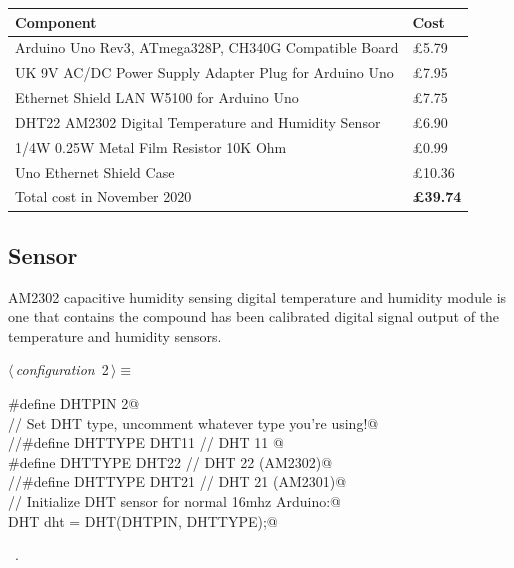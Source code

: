 \documentclass[a4paper, 12pt]{article}
\begin{document}
\begin{tabular}{ll}
  \textbf{Component} & \textbf{Cost} \\ 
  \hline
  Arduino Uno Rev3, ATmega328P, CH340G Compatible Board & \pounds 5.79 \\
  UK 9V AC/DC Power Supply Adapter Plug for Arduino Uno & \pounds 7.95 \\
  Ethernet Shield LAN W5100 for Arduino Uno & \pounds 7.75 \\
  DHT22 AM2302 Digital Temperature and Humidity Sensor & \pounds 6.90 \\
  1/4W 0.25W Metal Film Resistor 10K Ohm & \pounds 0.99 \\
  Uno Ethernet Shield Case & \pounds 10.36 \\
  \hline
  Total cost in November 2020 & \textbf{\pounds 39.74}  \\
\end{tabular}

\subsection{Sensor}

AM2302 capacitive humidity sensing digital temperature and humidity module is one that contains the
compound has been calibrated digital signal output of the temperature and humidity sensors. 

\begin{flushleft} \small
\begin{minipage}{\linewidth}\label{scrap1}\raggedright\small
{}$\langle\,${\itshape configuration}\nobreak\ {\footnotesize{2}}$\,\rangle\equiv$
\vspace{-1ex}
\begin{list}{}{\setlength{\leftmargin}{1em}} \item
\mbox{}\verb@  #define DHTPIN 2@\\
\mbox{}\verb@  // Set DHT type, uncomment whatever type you're using!@\\
\mbox{}\verb@  //#define DHTTYPE DHT11   // DHT 11 @\\
\mbox{}\verb@  #define DHTTYPE DHT22   // DHT 22  (AM2302)@\\
\mbox{}\verb@  //#define DHTTYPE DHT21   // DHT 21 (AM2301)@\\
\mbox{}\verb@  // Initialize DHT sensor for normal 16mhz Arduino:@\\
\mbox{}\verb@  DHT dht = DHT(DHTPIN, DHTTYPE);@\\
\mbox{}{\NWsep}
\end{list}
\vspace{-1ex}
\vspace{-1ex}
\footnotesize
\begin{list}{}{\setlength{\itemsep}{-\parsep}\setlength{\itemindent}{-\leftmargin}}
\item \NWtxtMacroRefIn\ .
\end{list}
\end{minipage}
\end{flushleft}
\end{document}
